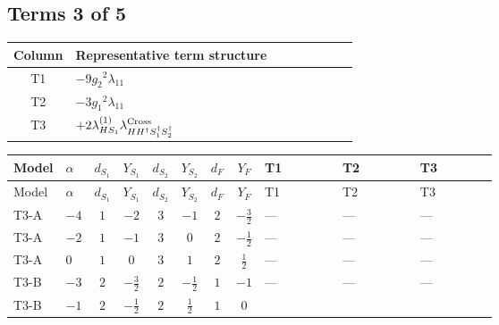 \documentclass[8pt]{article}
\begin{document}
\begin{landscape}
\subsection*{Terms 3 of 5}
\begin{center}
\begin{tabular}{@{}c >{\raggedright\arraybackslash}p{0.82\linewidth}@{}}
\toprule
Column & Representative term structure \\
\midrule
T1 & \(\displaystyle -9 {g_2}^2 {\lambda_{11}}\) \\
\midrule
T2 & \(\displaystyle -3 {g_1}^2 {\lambda_{11}}\) \\
\midrule
T3 & \(\displaystyle +2 {\lambda_{HS_1}^{(1)}} {\lambda_{H H^\dagger S_1^\dagger S_2^\dagger}^{\rm Cross}}\) \\
\midrule
\bottomrule
\end{tabular}
\end{center}
\smallskip
\tiny
\begin{longtable}{@{}llcccccc >{\raggedright\arraybackslash}p{0.21\linewidth} >{\raggedright\arraybackslash}p{0.21\linewidth} >{\raggedright\arraybackslash}p{0.21\linewidth}@{}}
\toprule
Model & $\alpha$ & $d_{S_1}$ & $Y_{S_1}$ & $d_{S_2}$ & $Y_{S_2}$ & $d_F$ & $Y_F$ & T1 & T2 & T3 \\
\midrule
\endfirsthead
\toprule
Model & $\alpha$ & $d_{S_1}$ & $Y_{S_1}$ & $d_{S_2}$ & $Y_{S_2}$ & $d_F$ & $Y_F$ & T1 & T2 & T3 \\
\midrule
\endhead
T3-A & $-4$ & $1$ & $-2$ & $3$ & $-1$ & $2$ & $-\frac{3}{2}$ & --- & --- & --- \\
\midrule
T3-A & $-2$ & $1$ & $-1$ & $3$ & $0$ & $2$ & $-\frac{1}{2}$ & --- & --- & --- \\
\midrule
T3-A & $0$ & $1$ & $0$ & $3$ & $1$ & $2$ & $\frac{1}{2}$ & --- & --- & --- \\
\midrule
T3-B & $-3$ & $2$ & $-\frac{3}{2}$ & $2$ & $-\frac{1}{2}$ & $1$ & $-1$ & --- & --- & --- \\
\midrule
T3-B & $-1$ & $2$ & $-\frac{1}{2}$ & $2$ & $\frac{1}{2}$ & $1$ & $0$ & \scriptsize\adjustbox{max width=\linewidth}{$\begin{gathered} -9 {g_2}^2 {\lambda_{11}}\end{gathered}$} & \scriptsize\adjustbox{max width=\linewidth}{$\begin{gathered} -3 {g_1}^2 {\lambda_{11}}\end{gathered}$} & \scriptsize\adjustbox{max width=\linewidth}{$\begin{gathered} +2 {\lambda_{HS_1}^{(1)}} {\lambda_{H H^\dagger S_1^\dagger S_2^\dagger}^{\rm Cross}}\end{gathered}$} \\

\end{longtable}
\end{landscape}
\end{document}
